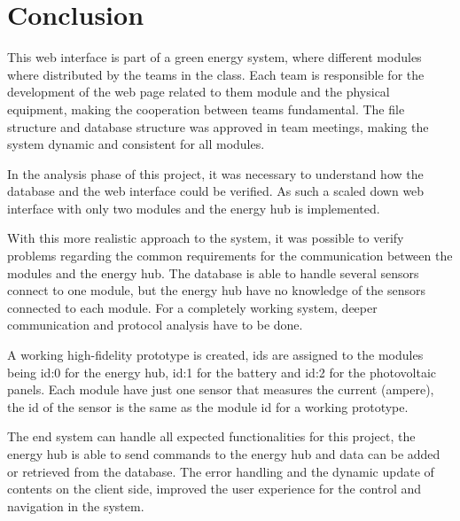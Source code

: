 \section{Conclusion}
This web interface is part of a green energy system, where different modules where distributed by the teams in the class. Each team is responsible for the development of the web page related to them module and the physical equipment, making the cooperation between teams fundamental. The file structure and database structure was approved in team meetings, making the system dynamic and consistent for all modules.

In the analysis phase of this project, it was necessary to understand how the database and the web interface could be verified. As such a scaled down web interface with only two modules and the energy hub is implemented.

With this more realistic approach to the system, it was possible to verify problems regarding the common requirements for the communication between the modules and the energy hub. The database is able to handle several sensors connect to one module, but the energy hub have no knowledge of the sensors connected to each module. For a completely working system, deeper communication and protocol analysis have to be done.

A working high-fidelity prototype is created, ids are assigned to the modules being id:0 for the energy hub, id:1 for the battery and id:2 for the photovoltaic panels. Each module have just one sensor that measures the current (ampere), the id of the sensor is the same as the module id for a working prototype.

The end system can handle all expected functionalities for this project, the energy hub is able to send commands to the energy hub and data can be added or retrieved from the database. The error handling and the dynamic update of contents on the client side, improved the user experience for the control and navigation in the system.